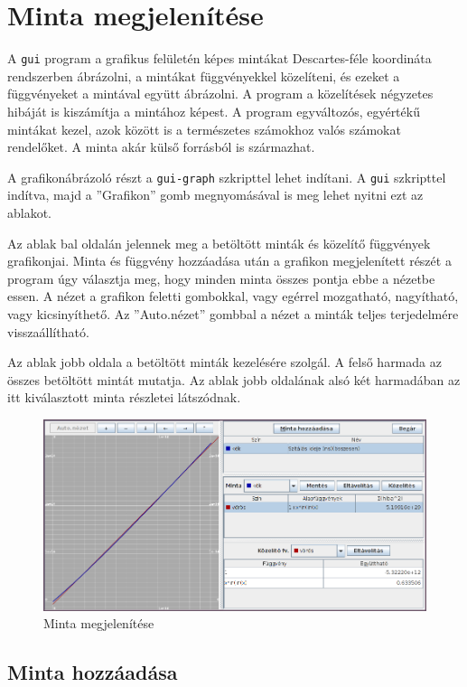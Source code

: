 \section{Minta megjelenítése}

A \texttt{gui} program a grafikus felületén képes mintákat Descartes-féle koordináta rendszerben ábrázolni, a mintákat függvényekkel közelíteni, és ezeket a függvényeket a mintával együtt ábrázolni.
A program a közelítések négyzetes hibáját is kiszámítja a mintához képest.
A program egyváltozós, egyértékű mintákat kezel, azok között is a természetes számokhoz valós számokat rendelőket.
A minta akár külső forrásból is származhat.

A grafikonábrázoló részt a \texttt{gui-graph} szkripttel lehet indítani. A \texttt{gui} szkripttel indítva, majd a ''Grafikon'' gomb megnyomásával is meg lehet nyitni ezt az ablakot.

Az ablak bal oldalán jelennek meg a betöltött minták és közelítő függvények grafikonjai.
Minta és függvény hozzáadása után a grafikon megjelenített részét a program úgy választja meg, hogy minden minta összes pontja ebbe a nézetbe essen.
A nézet a grafikon feletti gombokkal, vagy egérrel mozgatható, nagyítható, vagy kicsinyíthető.
Az ''Auto.nézet'' gombbal a nézet a minták teljes terjedelmére visszaállítható.

Az ablak jobb oldala a betöltött minták kezelésére szolgál.
A felső harmada az összes betöltött mintát mutatja.
Az ablak jobb oldalának alsó két harmadában az itt kiválasztott minta részletei látszódnak.

\begin{figure}[H]
\caption{Minta megjelenítése}
\centering
\includegraphics[scale=0.5]{graph.png}
\end{figure}

\subsection{Minta hozzáadása}

